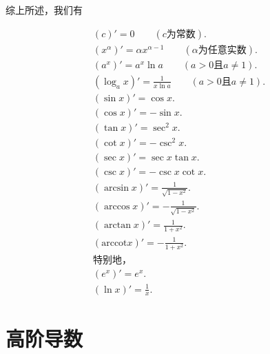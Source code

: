 综上所述，我们有
\begin{proposition}[基本初等函数的导数公式]
	\iffalse
	$$(c)'=0\qquad(c\text{为常数}).$$
	$$(x^\alpha)'=\alpha x^{\alpha-1}\qquad(\alpha\text{为任意实数}).$$
	$$(a^x)'=a^x\ln a\qquad(a>0\text{且}a\neq 1).$$
	$$(\log_ax)'=\frac{1}{x\ln a}\qquad(a>0\text{且}a\neq 1).$$
	$$(\sin x)'=\cos x.$$
	$$(\cos x)'=-\sin x.$$
	$$(\tan x)'=\sec^2x.$$
	$$(\cot x)'=-\csc^2x.$$
	$$(\sec x)'=\sec x\tan x.$$
	$$(\csc x)'=-\csc x\cot x.$$
	$$(\arcsin x)'=\frac{1}{\sqrt{1-x^2}}.$$
	$$(\arccos x)'=-\frac{1}{\sqrt{1-x^2}}.$$
	$$(\arctan x)'=\frac{1}{1+x^2}.$$
	$$(\text{arccot} x)'=-\frac{1}{1+x^2}.$$
	特别地，
	$$(e^x)'=e^x.$$
	$$(\ln x)'=\frac{1}{x}$$
	\fi
	\begin{align*}
		&(c)'=0\qquad(c\text{为常数}).\\
		&(x^\alpha)'=\alpha x^{\alpha-1}\qquad(\alpha\text{为任意实数}).\\
		&(a^x)'=a^x\ln a\qquad(a>0\text{且}a\neq 1).\\
		&(\log_ax)'=\frac{1}{x\ln a}\qquad(a>0\text{且}a\neq 1).\\
		&(\sin x)'=\cos x.\\
		&(\cos x)'=-\sin x.\\
		&(\tan x)'=\sec^2x.\\
		&(\cot x)'=-\csc^2x.\\
		&(\sec x)'=\sec x\tan x.\\
		&(\csc x)'=-\csc x\cot x.\\
		&(\arcsin x)'=\frac{1}{\sqrt{1-x^2}}.\\
		&(\arccos x)'=-\frac{1}{\sqrt{1-x^2}}.\\
		&(\arctan x)'=\frac{1}{1+x^2}.\\
		&(\text{arccot} x)'=-\frac{1}{1+x^2}.\\
		&\text{特别地，}\\
		&(e^x)'=e^x.\\
		&(\ln x)'=\frac{1}{x}.&
	\end{align*}
\end{proposition}
\section{高阶导数}
